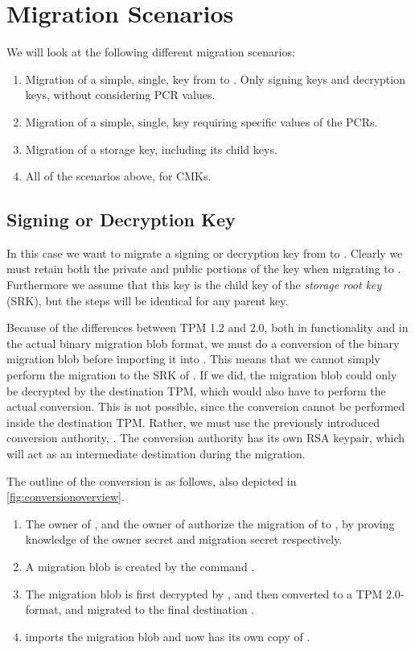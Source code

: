 {\section{Migration Scenarios} \label{sec:scenarios}
We will look at the following different migration scenarios:

\begin{enumerate}
	\item Migration of a simple, single, key from \tpms{} to \tpmd{}. Only signing keys and decryption keys, without considering PCR values. %
	\item Migration of a simple, single, key requiring specific values of the PCRs.
	\item Migration of a storage key, including its child keys.
	\item All of the scenarios above, for CMKs.
\end{enumerate}

\subsection{Signing or Decryption Key} \label{sec:simple}
In this case we want to migrate a signing or decryption key from \tpms{} to \tpmd{}. Clearly we must retain both the private and public portions of the key when migrating to \tpmd{}. Furthermore we assume that this key is the child key of the \emph{storage root key} (SRK), but the steps will be identical for any parent key.

Because of the differences between TPM 1.2 and 2.0, both in functionality and in the actual binary migration blob format, we must do a conversion of the binary migration blob before importing it into \tpmd{}. This means that we cannot simply perform the migration to the SRK of \tpmd{}. If we did, the migration blob could only be decrypted by the destination TPM, which would also have to perform the actual conversion. This is not possible, since the conversion cannot be performed inside the destination TPM. Rather, we must use the previously introduced conversion authority, \ca{}. The conversion authority has its own RSA keypair, which will act as an intermediate destination during the migration.

The outline of the conversion is as follows, also depicted in \autoref{fig:conversionoverview}.

\begin{enumerate}
	\item The owner of \tpms{}, and the owner of \ek{} authorize the migration of \ek{} to \ca{}, by proving knowledge of the owner secret and migration secret respectively.
	\item A migration blob is created by the command .
	\item The migration blob is first decrypted by \ca{}, and then converted to a TPM 2.0-format, and migrated to the final destination \tpmd{}.
	\item \tpmd{} imports the migration blob and now has its own copy of \ek{}.
\end{enumerate}

}
